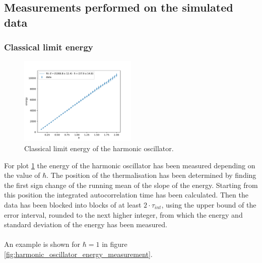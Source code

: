 \documentclass{scrartcl}
\begin{document}
	\subsection{Measurements performed on the simulated data}
	\label{sec:measurements}
	\subsubsection{Classical limit energy}
		\begin{figure}[H]
			\centering
				\includegraphics[width=0.5\textwidth]{../imgs/harmonic_oscillator_classical_limit_energy/harmonic_oscillator_10_classical_limit_energy.pdf}
			\caption{Classical limit energy of the harmonic oscillator.}
			\label{fig:harmonic_oscillator_classical_limit_energy}
		\end{figure}
		For plot \ref{fig:harmonic_oscillator_classical_limit_energy} the energy of the harmonic oscillator has been measured depending on the value of $\hbar$.
		The position of the thermalisation has been determined by finding the first sign change of the running mean of the slope of the energy.
		Starting from this position the integrated autocorrelation time has been calculated.
		Then the data has been blocked into blocks of at least $2 \cdot \tau_{int}$, using the upper bound of the error interval, rounded to the next higher integer, from which the energy and standard deviation of the energy has been measured.
		\\\\
		An example is shown for $\hbar = 1$ in figure \ref{fig:harmonic_oscillator_energy_measurement}.
\end{document}
